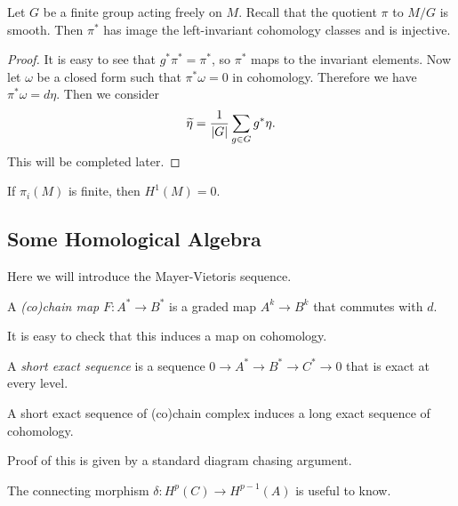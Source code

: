 \documentclass[twoside, 10pt]{article}
\begin{document}
    \begin{thm} Let $G$ be a finite group acting freely on $M$. Recall that the
    quotient $\pi$ to $M/G$ is smooth. Then $\pi^*$ has image the
left-invariant cohomology classes and is injective.  \end{thm}

    \begin{proof} It is easy to see that $g^*\pi^* = \pi^*$, so $\pi^*$ maps to
        the invariant elements. Now let $\omega$ be a closed form such that
        $\pi^*\omega = 0$ in cohomology. Therefore we have $\pi^*\omega =
        d\eta$. Then we consider \[\widetilde{\eta} = \frac{1}{\lvert G\rvert} \sum_{g
        \in G}g^*\eta. \] This will be completed later.  \end{proof}

    \begin{cor} If $\pi_i(M)$ is finite, then $H^1(M) = 0$.  \end{cor}

    \subsection{Some Homological Algebra}%
    
    Here we will introduce the Mayer-Vietoris sequence.

    \begin{defn} A \textit{(co)chain map} $F:A^* \to B^*$ is a graded map $A^k
    \to B^k$ that commutes with $d$.  \end{defn}

    It is easy to check that this induces a map on cohomology.

    \begin{defn} A \textit{short exact sequence} is a sequence $0 \to A^* \to
    B^* \to C^* \to 0$ that is exact at every level.  \end{defn}

    \begin{lem} A short exact sequence of (co)chain complex
    induces a long exact sequence of cohomology.  \end{lem}

    Proof of this is given by a standard diagram chasing argument.

    \begin{rmk} The connecting morphism $\delta: H^p(C) \to H^{p-1}(A)$ is
    useful to know.  \end{rmk}
\end{document}
